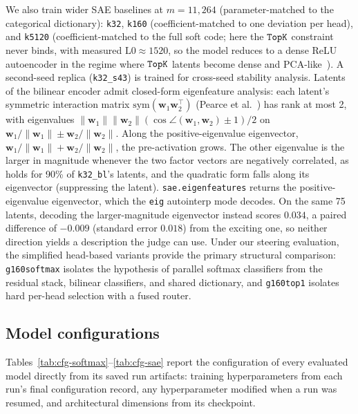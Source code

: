 We also train wider SAE baselines at $m{=}11{,}264$ (parameter-matched to
the categorical dictionary): \texttt{k32}, \texttt{k160}
(coefficient-matched to one
deviation per head), and \texttt{k5120} (coefficient-matched to the full
soft code; here the $\mathop{\mathtt{TopK}}\limits$ constraint never binds, with measured
$\mathrm{L0} \approx 1520$, so the model reduces to a dense ReLU
autoencoder in the regime where $\mathop{\mathtt{TopK}}\limits$ latents become dense and
PCA-like~\cite{gao2024}). A second-seed replica (\texttt{k32\_s43}) is
trained for cross-seed stability analysis. Latents of the bilinear encoder
admit closed-form eigenfeature analysis: each latent's symmetric
interaction matrix $\mathrm{sym}(\mathbf{w}_1 \mathbf{w}_2^\top)$
(Pearce et al.~\cite{pearce2025}) has rank at most 2, with eigenvalues
$\lVert\mathbf{w}_1\rVert\lVert\mathbf{w}_2\rVert
(\cos\angle(\mathbf{w}_1,\mathbf{w}_2) \pm 1)/2$ on
$\mathbf{w}_1/\lVert\mathbf{w}_1\rVert \pm
\mathbf{w}_2/\lVert\mathbf{w}_2\rVert$. Along the positive-eigenvalue
eigenvector,
$\mathbf{w}_1/\lVert\mathbf{w}_1\rVert + \mathbf{w}_2/\lVert\mathbf{w}_2\rVert$,
the pre-activation grows. The other eigenvalue is the larger in magnitude
whenever the two factor vectors are negatively correlated, as holds for
90\% of \texttt{k32\_bl}'s latents, and the quadratic form falls along its
eigenvector (suppressing the latent). \texttt{sae.eigenfeatures} returns the
positive-eigenvalue eigenvector, which the \texttt{eig} autointerp mode
decodes. On the same 75 latents, decoding the larger-magnitude eigenvector
instead scores $0.034$, a paired difference of $-0.009$ (standard error
$0.018$) from the exciting one, so neither direction yields a description
the judge can use.
Under our steering evaluation, the simplified head-based variants provide
the primary structural comparison: \texttt{g160softmax} isolates the
hypothesis of parallel softmax classifiers from the residual stack,
bilinear classifiers, and shared dictionary, and \texttt{g160top1} isolates
hard per-head selection with a fused router.

\subsection{Model configurations}
\label{app:configs}

Tables~\ref{tab:cfg-softmax}--\ref{tab:cfg-sae} report the configuration of
every evaluated model directly from its saved run artifacts: training
hyperparameters from each run's final configuration record, any
hyperparameter modified when a run was resumed, and architectural
dimensions from its checkpoint.


